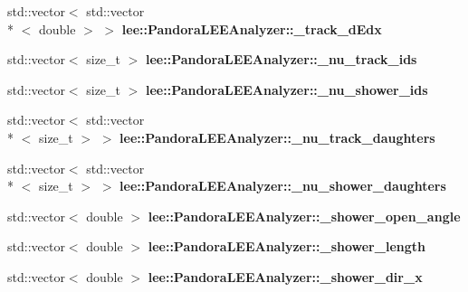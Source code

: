 \begin{DoxyCompactItemize}
\item 
\hypertarget{group__lee_ga81034997677b254a8fa7fb9c090fa756}{std\-::vector$<$ std\-::vector\\*
$<$ double $>$ $>$ {\bfseries lee\-::\-Pandora\-L\-E\-E\-Analyzer\-::\-\_\-track\-\_\-d\-Edx}}\label{group__lee_ga81034997677b254a8fa7fb9c090fa756}

\item 
\hypertarget{group__lee_ga5253913419cf4211211558082106bd62}{std\-::vector$<$ size\-\_\-t $>$ {\bfseries lee\-::\-Pandora\-L\-E\-E\-Analyzer\-::\-\_\-nu\-\_\-track\-\_\-ids}}\label{group__lee_ga5253913419cf4211211558082106bd62}

\item 
\hypertarget{group__lee_ga063d4fec5b4b40b812147b1b77be79a3}{std\-::vector$<$ size\-\_\-t $>$ {\bfseries lee\-::\-Pandora\-L\-E\-E\-Analyzer\-::\-\_\-nu\-\_\-shower\-\_\-ids}}\label{group__lee_ga063d4fec5b4b40b812147b1b77be79a3}

\item 
\hypertarget{group__lee_gacb2657deb7fca8bcf8c97952d7a012cf}{std\-::vector$<$ std\-::vector\\*
$<$ size\-\_\-t $>$ $>$ {\bfseries lee\-::\-Pandora\-L\-E\-E\-Analyzer\-::\-\_\-nu\-\_\-track\-\_\-daughters}}\label{group__lee_gacb2657deb7fca8bcf8c97952d7a012cf}

\item 
\hypertarget{group__lee_ga4d78972623fa65077421a091e226f61f}{std\-::vector$<$ std\-::vector\\*
$<$ size\-\_\-t $>$ $>$ {\bfseries lee\-::\-Pandora\-L\-E\-E\-Analyzer\-::\-\_\-nu\-\_\-shower\-\_\-daughters}}\label{group__lee_ga4d78972623fa65077421a091e226f61f}

\item 
\hypertarget{group__lee_ga9e637e1f18334830d94136b89c4d0138}{std\-::vector$<$ double $>$ {\bfseries lee\-::\-Pandora\-L\-E\-E\-Analyzer\-::\-\_\-shower\-\_\-open\-\_\-angle}}\label{group__lee_ga9e637e1f18334830d94136b89c4d0138}

\item 
\hypertarget{group__lee_ga88255d9d3a3a401c834d624076c30d5b}{std\-::vector$<$ double $>$ {\bfseries lee\-::\-Pandora\-L\-E\-E\-Analyzer\-::\-\_\-shower\-\_\-length}}\label{group__lee_ga88255d9d3a3a401c834d624076c30d5b}

\item 
\hypertarget{group__lee_gaac6afc45d77fbbfb38addc97038e1893}{std\-::vector$<$ double $>$ {\bfseries lee\-::\-Pandora\-L\-E\-E\-Analyzer\-::\-\_\-shower\-\_\-dir\-\_\-x}}\label{group__lee_gaac6afc45d77fbbfb38addc97038e1893}


\end{DoxyCompactItemize}
